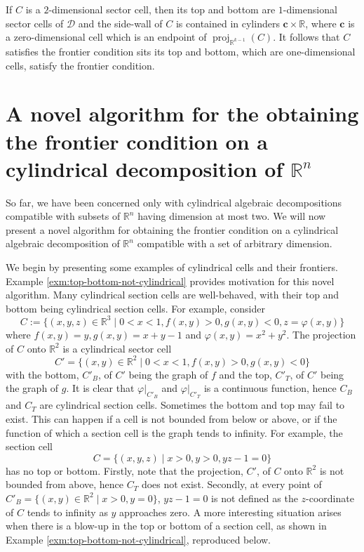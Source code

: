 \documentclass[
]{book}
\theoremstyle{definition}
\theoremstyle{definition}
\theoremstyle{definition}
\theoremstyle{definition}
\theoremstyle{remark}
\begin{document}
If \(C\) is a \(2\)-dimensional sector cell, then its top and bottom are \(1\)-dimensional sector cells of \(\mathcal{D}\) and the side-wall of \(C\) is contained in cylinders \(\mathbf{c} \times \mathbb{R}\), where \(\mathbf{c}\) is a zero-dimensional cell which is an endpoint of \({\operatorname{proj}_{\mathbb{R}^{k-1}}}(C)\). It follows that \(C\) satisfies the frontier condition sits its top and bottom, which are one-dimensional cells, satisfy the frontier condition.

\hypertarget{sec:novel-frontier}{%
\chapter{\texorpdfstring{A novel algorithm for the obtaining the frontier condition on a cylindrical decomposition of \(\mathbb{R}^n\)}{A novel algorithm for the obtaining the frontier condition on a cylindrical decomposition of \textbackslash mathbb\{R\}\^{}n}}\label{sec:novel-frontier}}

So far, we have been concerned only with cylindrical algebraic decompositions compatible with subsets of \(\mathbb{R}^n\) having dimension at most two. We will now present a novel algorithm for obtaining the frontier condition on a cylindrical algebraic decomposition of \(\mathbb{R}^n\) compatible with a set of arbitrary dimension.

We begin by presenting some examples of cylindrical cells and their frontiers. Example \ref{exm:top-bottom-not-cylindrical} provides motivation for this novel algorithm.
Many cylindrical section cells are well-behaved, with their top and bottom being cylindrical section cells.
For example, consider
\[
C := \{ (x,y,z) \in \mathbb{R}^3 \mid 0 < x < 1, f(x,y) > 0, g(x,y) < 0, z = \varphi(x,y) \}
\]
where \(f(x,y) = y, g(x,y) = x + y - 1\) and \(\varphi(x,y) = x^2 + y^2\).
The projection of \(C\) onto \(\mathbb{R}^2\) is a cylindrical sector cell
\[
C' = \{ (x,y) \in \mathbb{R}^2 \mid 0 < x < 1, f(x,y) > 0, g(x,y) < 0 \}
\]
with the bottom, \(C'_B\), of \(C'\) being the graph of \(f\) and the top, \(C'_T\), of \(C'\) being the graph of \(g\). It is clear that \(\varphi\vert_{C'_B}\) and \(\varphi\vert_{C'_T}\) is a continuous function, hence \(C_B\) and \(C_T\) are cylindrical section cells.
Sometimes the bottom and top may fail to exist. This can happen if a cell is not bounded from below or above, or if the function of which a section cell is the graph tends to infinity. For example, the section cell
\[
C = \{ (x,y,z) \mid x > 0, y > 0, y z - 1 = 0 \}
\]
has no top or bottom. Firstly, note that the projection, \(C'\), of \(C\) onto \(\mathbb{R}^2\) is not bounded from above, hence \(C_T\) does not exist. Secondly, at every point of \(C'_B = \{ (x,y) \in \mathbb{R}^2 \mid x > 0, y = 0 \}\), \(yz - 1 = 0\) is not defined as the \(z\)-coordinate of \(C\) tends to infinity as \(y\) approaches zero.
A more interesting situation arises when there is a blow-up in the top or bottom of a section cell, as shown in Example \ref{exm:top-bottom-not-cylindrical}, reproduced below.
\end{document}
